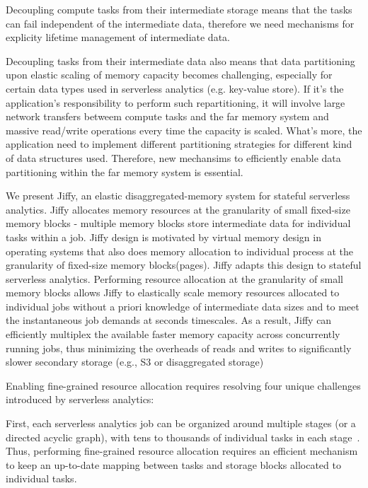 Decoupling compute tasks from their intermediate storage means that the tasks can fail independent of the intermediate data, therefore we need mechanisms for explicity lifetime management of intermediate data.

Decoupling tasks from their intermediate data also means that data partitioning upon elastic scaling of memory capacity becomes challenging, especially for certain data types used in serverless analytics (e.g. key-value store). If it's the application's responsibility to perform such repartitioning, it will involve large network transfers betweem compute tasks and the far memory system and massive read/write operations every time the capacity is scaled. What's more, the application need to implement different partitioning strategies for different kind of data structures used. Therefore, new mechansims to efficiently enable data partitioning within the far memory system is essential.


We present Jiffy, an elastic disaggregated-memory system for stateful serverless analytics. Jiffy allocates memory resources at the granularity of small fixed-size memory blocks - multiple memory blocks store intermediate data for individual tasks within a job. Jiffy design is motivated by virtual memory design in operating systems that also does memory allocation to individual process at the granularity of fixed-size memory blocks(pages). Jiffy adapts this design to stateful serverless analytics. Performing resource allocation at the granularity of small memory blocks allows Jiffy to elastically scale memory resources allocated to individual jobs without a priori knowledge of intermediate data sizes and to meet the instantaneous job demands at seconds timescales. As a result, Jiffy can efficiently multiplex the available faster memory capacity across concurrently running jobs, thus minimizing the overheads of reads and writes to significantly slower secondary storage (e.g., S3 or disaggregated storage)



Enabling fine-grained resource allocation requires resolving four unique challenges introduced by serverless analytics:

First, each serverless analytics job can be organized around multiple stages (or a directed acyclic graph), with tens to thousands of individual tasks in each stage~\cite{starling, locus, pocket, flint, sparkonlambda, cirrus, excamera, pywren, numpywren, gg, athena, aurora, azuresqldw, cloudburst, snowset}. Thus, performing fine-grained resource allocation requires an efficient mechanism to keep an up-to-date mapping between tasks and storage blocks allocated to individual tasks.
  
